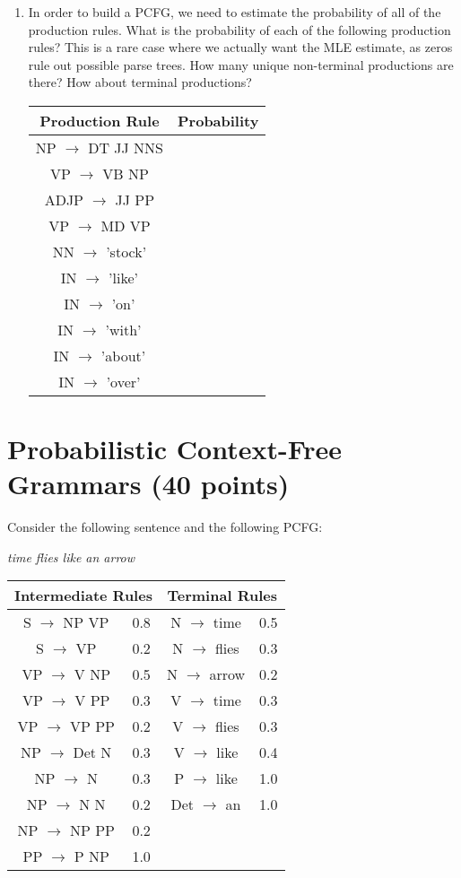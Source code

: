 \documentclass[11pt,twoside]{article}
\begin{document}
\begin{enumerate}
\item In order to build a PCFG, we need to estimate the probability of all of the production rules.  What is the probability of each of the following production rules?  This is a rare case where we actually want the MLE estimate, as zeros rule out possible parse trees.  How many unique non-terminal productions are there?  How about terminal productions?
\begin{center}
\begin{tabular}{c|c}
Production Rule & Probability \\
\hline
NP $\rightarrow$ DT JJ NNS & \\
VP $\rightarrow$ VB NP & \\
ADJP $\rightarrow$ JJ PP & \\
VP $\rightarrow$ MD VP & \\
NN $\rightarrow$ 'stock' & \\
IN $\rightarrow$ 'like' & \\
IN $\rightarrow$ 'on' & \\
IN $\rightarrow$ 'with' & \\
IN $\rightarrow$ 'about' & \\
IN $\rightarrow$ 'over' & \\
\end{tabular}
\end{center}

\end{enumerate}

\section{Probabilistic Context-Free Grammars (40 points)}

Consider the following sentence and the following PCFG:

\begin{center}
	{\em time flies like an arrow }\\ 
\begin{tabular}{cl|cl}
\multicolumn{2}{c}{Intermediate Rules} & \multicolumn{2}{c}{Terminal Rules} \\
\hline
S $\rightarrow$ NP VP& 0.8 & N $\rightarrow$ time& 0.5 \\
S $\rightarrow$ VP& 0.2&  N $\rightarrow$ flies& 0.3 \\
VP $\rightarrow$ V NP& 0.5 & N $\rightarrow$ arrow& 0.2\\ 
VP $\rightarrow$ V PP& 0.3&  V $\rightarrow$ time& 0.3 \\
VP $\rightarrow$ VP PP& 0.2 & V $\rightarrow$ flies& 0.3 \\
NP $\rightarrow$ Det N& 0.3&  V $\rightarrow$ like& 0.4 \\
NP $\rightarrow$ N& 0.3&  P $\rightarrow$ like &1.0 \\
NP $\rightarrow$ N N& 0.2 & Det $\rightarrow$ an & 1.0 \\
NP $\rightarrow$ NP PP& 0.2 & \\
PP $\rightarrow$ P NP & 1.0 & \\
\end{tabular}
\end{center}
\end{document}
